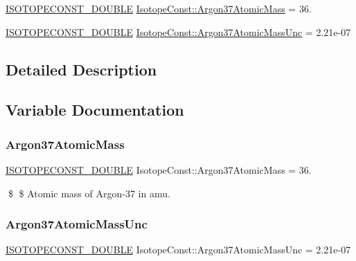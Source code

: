 \begin{DoxyCompactItemize}
\item 
\mbox{\hyperlink{group___isotope_const-_macros_ga8f45a7272ce02c0b4c65c44636ed719a}{I\+S\+O\+T\+O\+P\+E\+C\+O\+N\+S\+T\+\_\+\+D\+O\+U\+B\+LE}} \mbox{\hyperlink{group___isotope_const-_argon-_ar37_ga5c0b43212cf25ac054c2d972e5a43786}{Isotope\+Const\+::\+Argon37\+Atomic\+Mass}} = 36.
\item 
\mbox{\hyperlink{group___isotope_const-_macros_ga8f45a7272ce02c0b4c65c44636ed719a}{I\+S\+O\+T\+O\+P\+E\+C\+O\+N\+S\+T\+\_\+\+D\+O\+U\+B\+LE}} \mbox{\hyperlink{group___isotope_const-_argon-_ar37_ga4d615493458bbb63fbc4558c3afb5b8f}{Isotope\+Const\+::\+Argon37\+Atomic\+Mass\+Unc}} = 2.\+21e-\/07
\end{DoxyCompactItemize}


\subsection{Detailed Description}


\subsection{Variable Documentation}
\mbox{\label{group___isotope_const-_argon-_ar37_ga5c0b43212cf25ac054c2d972e5a43786}} 
\subsubsection{\texorpdfstring{Argon37\+Atomic\+Mass}{Argon37AtomicMass}}
{\footnotesize\ttfamily \mbox{\hyperlink{group___isotope_const-_macros_ga8f45a7272ce02c0b4c65c44636ed719a}{I\+S\+O\+T\+O\+P\+E\+C\+O\+N\+S\+T\+\_\+\+D\+O\+U\+B\+LE}} Isotope\+Const\+::\+Argon37\+Atomic\+Mass = 36.}

\$ \$ Atomic mass of Argon-\/37 in amu. \mbox{\label{group___isotope_const-_argon-_ar37_ga4d615493458bbb63fbc4558c3afb5b8f}} 
\subsubsection{\texorpdfstring{Argon37\+Atomic\+Mass\+Unc}{Argon37AtomicMassUnc}}
{\footnotesize\ttfamily \mbox{\hyperlink{group___isotope_const-_macros_ga8f45a7272ce02c0b4c65c44636ed719a}{I\+S\+O\+T\+O\+P\+E\+C\+O\+N\+S\+T\+\_\+\+D\+O\+U\+B\+LE}} Isotope\+Const\+::\+Argon37\+Atomic\+Mass\+Unc = 2.\+21e-\/07}

